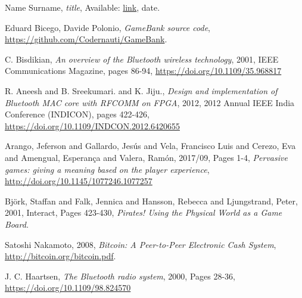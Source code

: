 %
%
%
\begin{thebibliography}{1}

  Name Surname,
  \emph{title},
  Available: \url{link},
  date.
  
  Eduard Bicego, Davide Polonio,
  \emph{GameBank source code},
  \url{https://github.com/Codernauti/GameBank}.
  
  C. Bisdikian,
  \emph{An overview of the Bluetooth wireless technology},
  2001,
  IEEE Communications Magazine, pages 86-94,
  \url{https://doi.org/10.1109/35.968817}

  R. Aneesh and B. Sreekumari. and K. Jiju.,
  \emph{Design and implementation of Bluetooth MAC core with RFCOMM on FPGA},
  2012,
  2012 Annual IEEE India Conference (INDICON), pages 422-426,
  \url{https://doi.org/10.1109/INDCON.2012.6420655}

  Arango, Jeferson and Gallardo, Jesús and Vela, Francisco Luis and Cerezo, Eva 
and Amengual, Esperança and Valera, Ramón,
  2017/09,
  Pages 1-4,
  \emph{Pervasive games: giving a meaning based on the player experience},
  \url{http://doi.org/10.1145/1077246.1077257}
  
  Bj{\"o}rk, Staffan and Falk, Jennica and Hansson, Rebecca and Ljungstrand, 
Peter,
  2001,
  Interact, Pages 423-430,
  \emph{Pirates! Using the Physical World as a Game Board.}
  
  Satoshi Nakamoto,
  2008,
  \emph{Bitcoin: A Peer-to-Peer Electronic Cash System},
  \url{http://bitcoin.org/bitcoin.pdf}.
  
  J. C. Haartsen,
  \emph{The Bluetooth radio system},
  2000,
  Pages 28-36,
  \url{https://doi.org/10.1109/98.824570}

\end{thebibliography}
